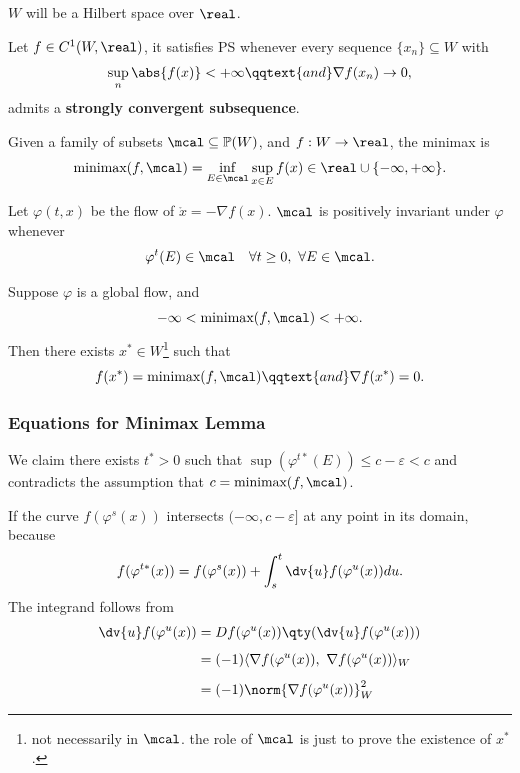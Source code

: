 \documentclass[../main-v2-manifolds.tex]{subfiles}
\begin{document}
$W$ will be a Hilbert space over $\real$.
\begin{definition}[PS Condition]
    Let $f\in C^1(W,\real)$, it satisfies PS whenever every sequence $\{x_n\}\subseteq W$ with
    \[
        \sup_n \abs{f(x)}<+\infty\qqtext{and}\nabla f(x_n)\to 0,
    \]
    admits a \textbf{strongly convergent subsequence}.
\end{definition}
\begin{definition}[Minimax]
    Given a family of subsets $\mcal\subseteq \mathbb{P}(W)$, and $f: W\to\real$, the minimax is
    \[
        \text{minimax}(f,\mcal) = \inf_{E\in\mcal}\sup_{x\in E}f(x)\in\real\cup\{-\infty,+\infty\}.
    \]
\end{definition}
\begin{definition}
    Let $\varphi(t,x)$ be the flow of $\mathring{x} = -\nabla f(x)$. $\mcal$ is positively invariant under $\varphi$ whenever
    \[\varphi^t(E)\in\mcal\quad\forall t\geq 0,\ \forall E\in\mcal.\]
\end{definition}
\begin{wts}
    Suppose $\varphi$ is a global flow, and 
    \[-\infty<\text{minimax}(f,\mcal)<+\infty.\] 
    Then there exists $x^*\in W$\footnote{not necessarily in $\mcal$. the role of $\mcal$ is just to prove the existence of $x^*$.} such that
        \[
            f(x^*) = \text{minimax}(f,\mcal)\qqtext{and}\nabla f(x^*) = 0.
        \]
\end{wts}
\subsubsection*{Equations for Minimax Lemma}
\begin{description}
    \item[Claim]
    We claim there exists $t^*>0$ such that $\sup(\varphi^{t*}(E))\leq c-\varepsilon<c$ and contradicts the assumption that $c = \text{minimax}(f,\mcal)$.
    \item If the curve $f(\varphi^{s}(x))$ intersects $(-\infty,c-\varepsilon]$ at any point in its domain, because
    \[
        f(\varphi^{t*}(x)) = f(\varphi^{s}(x)) + \int_{s}^{t}\dv{u}f(\varphi^{u}(x))du.
    \]
    The integrand follows from
    \begin{align*}
        \dv{u}f(\varphi^u(x)) &= Df(\varphi^{u}(x))\qty(\dv{u}f(\varphi^u(x)))\\[1ex]
        &= (-1)\langle \nabla f(\varphi^{u}(x)),\ \nabla f(\varphi^{u}(x))\rangle_{W} \\[1ex]
        &= (-1)\norm{\nabla f(\varphi^{u}(x))}^2_{W}
    \end{align*}
\end{description}
\end{document}
